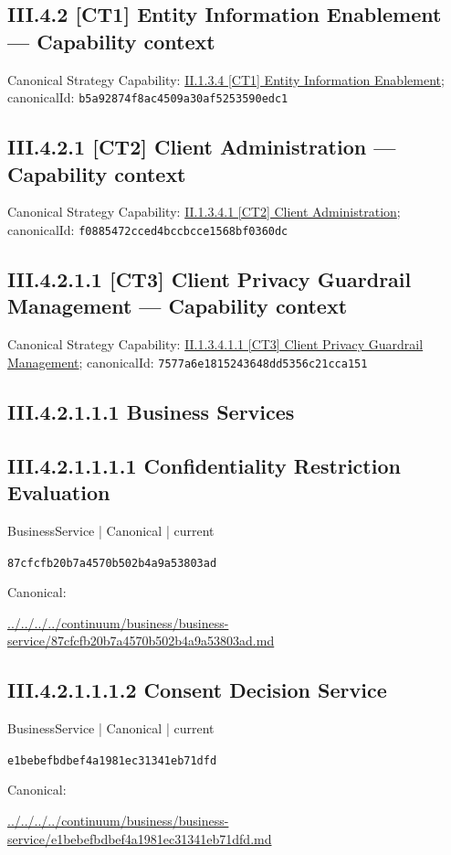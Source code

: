\documentclass[10pt,a4paper]{article}
\begin{document}
\subsection*{III.4.2 [CT1] Entity Information Enablement — Capability context}
Canonical Strategy Capability: \hyperref[element-b5a92874f8ac4509a30af5253590edc1]{II.1.3.4 [CT1] Entity Information Enablement}; canonicalId: \texttt{b5a92874f8ac4509a30af5253590edc1}\par
\subsection*{III.4.2.1 [CT2] Client Administration — Capability context}
Canonical Strategy Capability: \hyperref[element-f0885472cced4bccbcce1568bf0360dc]{II.1.3.4.1 [CT2] Client Administration}; canonicalId: \texttt{f0885472cced4bccbcce1568bf0360dc}\par
\subsection*{III.4.2.1.1 [CT3] Client Privacy Guardrail Management — Capability context}
Canonical Strategy Capability: \hyperref[element-7577a6e1815243648dd5356c21cca151]{II.1.3.4.1.1 [CT3] Client Privacy Guardrail Management}; canonicalId: \texttt{7577a6e1815243648dd5356c21cca151}\par
\subsection*{III.4.2.1.1.1 Business Services}
\subsection*{III.4.2.1.1.1.1 Confidentiality Restriction Evaluation}
\label{element-87cfcfb20b7a4570b502b4a9a53803ad}
{\small BusinessService | Canonical | current}\par
\texttt{87cfcfb20b7a4570b502b4a9a53803ad}\par
Canonical: \par
{\footnotesize\url{../../../../continuum/business/business-service/87cfcfb20b7a4570b502b4a9a53803ad.md}}\par
\subsection*{III.4.2.1.1.1.2 Consent Decision Service}
\label{element-e1bebefbdbef4a1981ec31341eb71dfd}
{\small BusinessService | Canonical | current}\par
\texttt{e1bebefbdbef4a1981ec31341eb71dfd}\par
Canonical: \par
{\footnotesize\url{../../../../continuum/business/business-service/e1bebefbdbef4a1981ec31341eb71dfd.md}}\par
\end{document}

